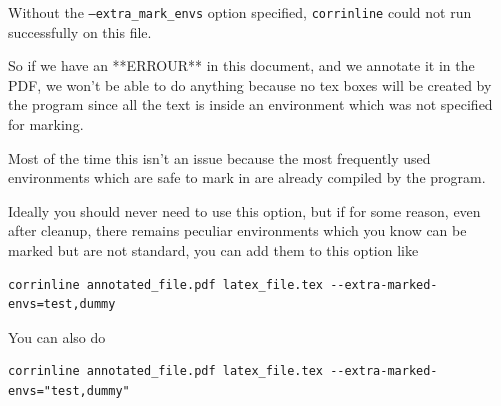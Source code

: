 \documentclass{amsart}
\newenvironment{dummy}{}{}
\newenvironment{test}{}{}
\begin{document}
\begin{dummy}
Without the \texttt{--extra\_mark\_envs} option specified, {\tt corrinline} could not run successfully on this file.

So if we have an **ERROUR** in this document, and we annotate it in the PDF, we won't be able to do anything because no tex boxes
will be created by the program since all the text is inside an environment which was not specified for marking.

Most of the time this isn't an issue because the most frequently used environments which are safe to mark in are already compiled
by the program.

Ideally you should never need to use this option, but if for some reason, even after cleanup, there remains
peculiar environments which you know can be marked but are not standard, you can add them to this option like
\begin{verbatim}
corrinline annotated_file.pdf latex_file.tex --extra-marked-envs=test,dummy
\end{verbatim}
\end{dummy}
\begin{test}
You can also do 
\begin{verbatim}
corrinline annotated_file.pdf latex_file.tex --extra-marked-envs="test,dummy"
\end{verbatim}
\end{test}
\end{document}

